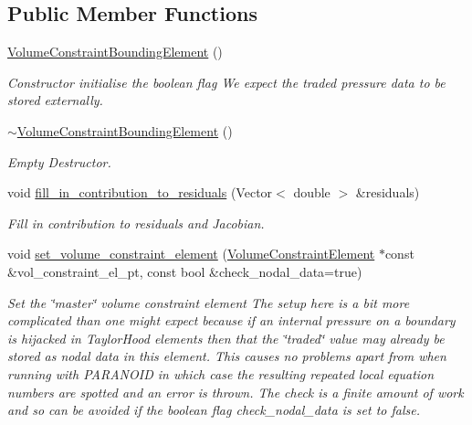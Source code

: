 \subsection*{Public Member Functions}
\begin{DoxyCompactItemize}
\item 
\hyperlink{classoomph_1_1VolumeConstraintBoundingElement_a423139995a5543fda59d36cf230edb44}{Volume\+Constraint\+Bounding\+Element} ()
\begin{DoxyCompactList}\small\item\em Constructor initialise the boolean flag We expect the traded pressure data to be stored externally. \end{DoxyCompactList}\item 
\hyperlink{classoomph_1_1VolumeConstraintBoundingElement_a6a54150611ce06f05ea47ba99cf9e132}{$\sim$\+Volume\+Constraint\+Bounding\+Element} ()
\begin{DoxyCompactList}\small\item\em Empty Destructor. \end{DoxyCompactList}\item 
void \hyperlink{classoomph_1_1VolumeConstraintBoundingElement_a0ae62125450a5d203bc6d26b0d24be22}{fill\+\_\+in\+\_\+contribution\+\_\+to\+\_\+residuals} (Vector$<$ double $>$ \&residuals)
\begin{DoxyCompactList}\small\item\em Fill in contribution to residuals and Jacobian. \end{DoxyCompactList}\item 
void \hyperlink{classoomph_1_1VolumeConstraintBoundingElement_a310fbaeb9a024406e4f769886e9f902a}{set\+\_\+volume\+\_\+constraint\+\_\+element} (\hyperlink{classoomph_1_1VolumeConstraintElement}{Volume\+Constraint\+Element} $\ast$const \&vol\+\_\+constraint\+\_\+el\+\_\+pt, const bool \&check\+\_\+nodal\+\_\+data=true)
\begin{DoxyCompactList}\small\item\em Set the \char`\"{}master\char`\"{} volume constraint element The setup here is a bit more complicated than one might expect because if an internal pressure on a boundary is hijacked in Taylor\+Hood elements then that the \char`\"{}traded\char`\"{} value may already be stored as nodal data in this element. This causes no problems apart from when running with P\+A\+R\+A\+N\+O\+ID in which case the resulting repeated local equation numbers are spotted and an error is thrown. The check is a finite amount of work and so can be avoided if the boolean flag check\+\_\+nodal\+\_\+data is set to false. \end{DoxyCompactList}\end{DoxyCompactItemize}
